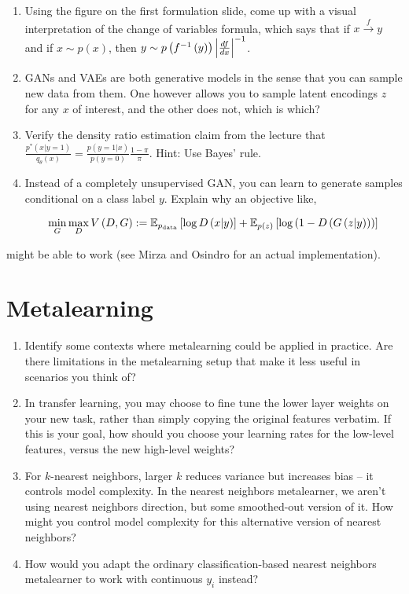\documentclass{article}
\begin{document}
\begin{enumerate}
\item Using the figure on the first formulation slide, come up with a visual
  interpretation of the change of variables formula, which says that if $x
  \xrightarrow{f} y$ and if $x \sim p\left(x\right)$, then $y \sim
  p\left(f^{-1}\left(y\right)\right)\left|\frac{df}{dx}\right|^{-1}$.
\item GANs and VAEs are both generative models in the sense that you can sample
  new data from them. One however allows you to sample latent encodings $z$ for
  any $x$ of interest, and the other does not, which is which?
\item Verify the density ratio estimation claim from the lecture that
  $\frac{p^{\ast}\left(x \vert y = 1\right)}{q_{\theta}\left(x\right)} =
  \frac{p\left(y = 1\vert x\right)}{p\left(y = 0\right)}\frac{1 - \pi}{\pi}$.
  Hint: Use Bayes' rule.
\item Instead of a completely unsupervised GAN, you can learn to generate
  samples conditional on a class label $y$. Explain why an objective like,

  \begin{align*}
    \min_{G}\max_{D} V\left(D, G\right) := \mathbb{E}_{p_{\text{data}}}\left[{\log D\left(x \vert y\right)}\right] + \mathbb{E}_{p\left(z\right)}\left[{\log\left(1 - D\left(G\left(z \vert y\right)\right)\right)}\right]
  \end{align*}
\end{enumerate}
might be able to work (see Mirza and Osindro for an actual implementation).

\section{Metalearning}

\begin{enumerate}
\item Identify some contexts where metalearning could be applied in practice.
  Are there limitations in the metalearning setup that make it less useful in
  scenarios you think of?

\item In transfer learning, you may choose to fine tune the lower layer weights
  on your new task, rather than simply copying the original features verbatim.
  If this is your goal, how should you choose your learning rates for the
  low-level features, versus the new high-level weights?

\item For $k$-nearest neighbors, larger $k$ reduces variance but increases bias
  -- it controls model complexity. In the nearest neighbors metalearner, we
  aren't using nearest neighbors direction, but some smoothed-out version of it.
  How might you control model complexity for this alternative version of nearest
  neighbors?

\item How would you adapt the ordinary classification-based nearest neighbors
  metalearner to work with continuous $y_i$ instead?

\end{enumerate}
\end{document}
